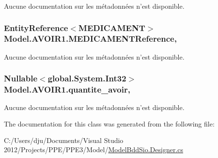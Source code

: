 Aucune documentation sur les métadonnées n'est disponible. 

\hypertarget{class_model_1_1_a_v_o_i_r1_a35632c4e829e1031b50c748726647cb1}{
\subsubsection[{M\-E\-D\-I\-C\-A\-M\-E\-N\-T\-Reference}]{\setlength{\rightskip}{0pt plus 5cm}Entity\-Reference$<${\bf M\-E\-D\-I\-C\-A\-M\-E\-N\-T}$>$ Model.\-A\-V\-O\-I\-R1.\-M\-E\-D\-I\-C\-A\-M\-E\-N\-T\-Reference\hspace{0.3cm}{\ttfamily [get]}, {\ttfamily [set]}}}\label{class_model_1_1_a_v_o_i_r1_a35632c4e829e1031b50c748726647cb1}


Aucune documentation sur les métadonnées n'est disponible. 

\hypertarget{class_model_1_1_a_v_o_i_r1_a254f425b0db72e17b64a10adabaa70b5}{
\subsubsection[{quantite\-\_\-avoir}]{\setlength{\rightskip}{0pt plus 5cm}Nullable$<$global.\-System.\-Int32$>$ Model.\-A\-V\-O\-I\-R1.\-quantite\-\_\-avoir\hspace{0.3cm}{\ttfamily [get]}, {\ttfamily [set]}}}\label{class_model_1_1_a_v_o_i_r1_a254f425b0db72e17b64a10adabaa70b5}


Aucune documentation sur les métadonnées n'est disponible. 



The documentation for this class was generated from the following file\-:\begin{DoxyCompactItemize}
\item 
C\-:/\-Users/dju/\-Documents/\-Visual Studio 2012/\-Projects/\-P\-P\-E/\-P\-P\-E3/\-Model/\hyperlink{_model_bdd_sio_8_designer_8cs}{Model\-Bdd\-Sio.\-Designer.\-cs}\end{DoxyCompactItemize}
